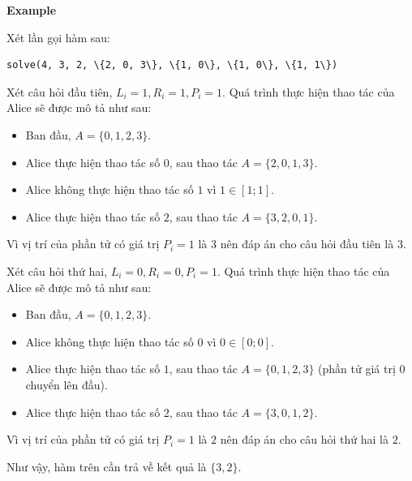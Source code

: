 \textbf{Example}

Xét lần gọi hàm sau:

\begin{lstlisting}
solve(4, 3, 2, \{2, 0, 3\}, \{1, 0\}, \{1, 0\}, \{1, 1\})
\end{lstlisting}

Xét câu hỏi đầu tiên, $L_i=1, R_i=1, P_i=1$. Quá trình thực hiện thao tác của Alice sẽ được mô tả như sau:
\begin{itemize}
    \item Ban đầu, $A=\{0,1,2,3\}$.
    \item Alice thực hiện thao tác số $0$, sau thao tác $A=\{2,0,1,3\}$.
    \item Alice không thực hiện thao tác số $1$ vì $1\in [1;1]$.
    \item Alice thực hiện thao tác số $2$, sau thao tác $A=\{3,2,0,1\}$.
\end{itemize}

Vì vị trí của phần tử có giá trị $P_i=1$ là $3$ nên đáp án cho câu hỏi đầu tiên là $3$.

Xét câu hỏi thứ hai, $L_i=0, R_i=0, P_i=1$. Quá trình thực hiện thao tác của Alice sẽ được mô tả như sau:
\begin{itemize}
    \item Ban đầu, $A=\{0,1,2,3\}$.
    \item Alice không thực hiện thao tác số $0$ vì $0\in [0;0]$.
    \item Alice thực hiện thao tác số $1$, sau thao tác $A=\{0,1,2,3\}$ (phần tử giá trị $0$ chuyển lên đầu).
    \item Alice thực hiện thao tác số $2$, sau thao tác $A=\{3,0,1,2\}$.
\end{itemize}

Vì vị trí của phần tử có giá trị $P_i=1$ là $2$ nên đáp án cho câu hỏi thứ hai là $2$.

Như vậy, hàm trên cần trả về kết quả là $\{3,2\}$.